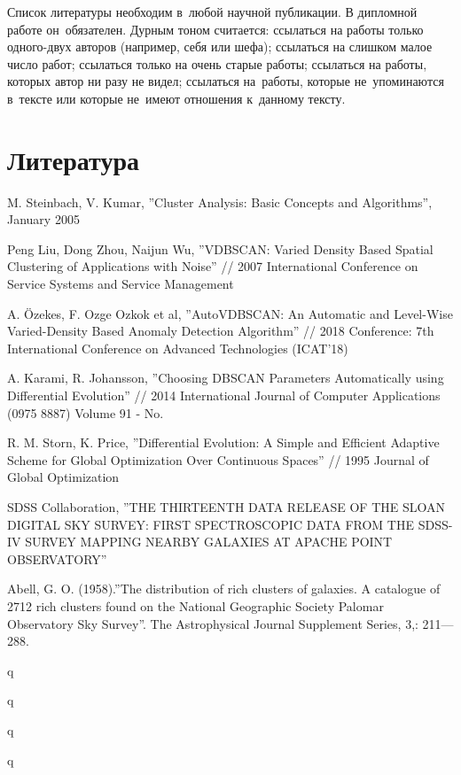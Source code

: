 \documentclass[12pt,fleqn]{article}
\begin{document}
\newpage
Список литературы необходим в~любой научной публикации.
В дипломной работе он~обязателен.
Дурным тоном считается:
ссылаться на работы только одного-двух авторов (например, себя или шефа);
ссылаться на слишком малое число работ;
ссылаться только на очень старые работы;
ссылаться на работы, которых автор ни разу не видел;
ссылаться на~работы, которые не~упоминаются в~тексте
или которые не~имеют отношения к~данному тексту.
\section{Литература}

\begin{thebibliography}{2}

M. Steinbach, V. Kumar, ''Cluster Analysis: Basic Concepts and Algorithms'', January 2005

Peng Liu, Dong Zhou, Naijun Wu,  ''VDBSCAN: Varied Density Based Spatial Clustering of Applications with Noise'' // 2007 International Conference on Service Systems and Service Management

A. Özekes, F. Ozge Ozkok et al, ''AutoVDBSCAN: An Automatic and Level-Wise Varied-Density Based Anomaly Detection Algorithm'' //  2018
Conference: 7th International Conference on Advanced Technologies (ICAT'18)

A. Karami, R. Johansson, ''Choosing DBSCAN Parameters Automatically using
Differential Evolution'' // 2014 International Journal of Computer Applications (0975 8887) Volume 91 - No.

R. M. Storn, K. Price, ''Differential Evolution: A Simple and Efficient Adaptive Scheme for Global Optimization Over Continuous Spaces'' // 1995 Journal of Global Optimization

SDSS Collaboration, ''THE THIRTEENTH DATA RELEASE OF THE SLOAN DIGITAL SKY SURVEY: FIRST SPECTROSCOPIC
DATA FROM THE SDSS-IV SURVEY MAPPING NEARBY GALAXIES AT APACHE POINT OBSERVATORY''

Abell, G. O. (1958).''The distribution of rich clusters of galaxies. A catalogue of 2712 rich clusters found on the National Geographic Society Palomar Observatory Sky Survey''. The Astrophysical Journal Supplement Series, 3,: 211—288.


q

q

q

q

\end{thebibliography}
\end{document}
